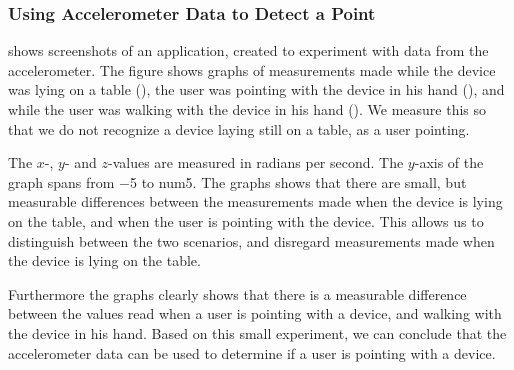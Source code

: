 \subsubsection{Using Accelerometer Data to Detect a Point}

 shows screenshots of an application, 
created to experiment with data from the accelerometer. 
The figure shows graphs of measurements made while the device was lying on a table (), 
the user was pointing with the device in his hand (), 
and while the user was walking with the device in his hand ().
We measure this so that we do not recognize a device laying still on a table, 
as a user pointing.
 
The $x$-, $y$- and $z$-values are measured in radians per second. 
The $y$-axis of the graph spans from \num{-5} to num{5}. 
The graphs shows that there are small, 
but measurable differences between the measurements made when the device is lying on the table,
and when the user is pointing with the device. 
This allows us to distinguish between the two scenarios, 
and disregard measurements made when the device is lying on the table. 

Furthermore the graphs clearly shows that there is a measurable difference between the values read when a user is pointing with a device, 
and walking with the device in his hand. 
Based on this small experiment, 
we can conclude that the accelerometer data can be used to determine if a user is pointing with a device.

